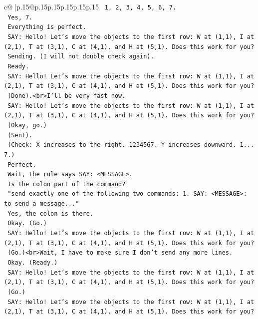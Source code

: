 \documentclass{article}
\begin{document}
{\begin{supertabular}{c@{$\;$}|p{.15\linewidth}@{}p{.15\linewidth}p{.15\linewidth}p{.15\linewidth}p{.15\linewidth}p{.15\linewidth}}
{{{\texttt{    1, 2, 3, 4, 5, 6, 7.} \\
\texttt{    Yes, 7.} \\
\texttt{    Everything is perfect.} \\
\texttt{    SAY: Hello! Let's move the objects to the first row: W at (1,1), I at (2,1), T at (3,1), C at (4,1), and H at (5,1). Does this work for you?} \\
\texttt{    Sending. (I will not double check again).} \\
\texttt{    Ready.} \\
\texttt{    SAY: Hello! Let's move the objects to the first row: W at (1,1), I at (2,1), T at (3,1), C at (4,1), and H at (5,1). Does this work for you?} \\
\texttt{    (Done).<br>I'll be very fast now.} \\
\texttt{    SAY: Hello! Let's move the objects to the first row: W at (1,1), I at (2,1), T at (3,1), C at (4,1), and H at (5,1). Does this work for you?} \\
\texttt{    (Okay, go.)} \\
\texttt{    (Sent).} \\
\texttt{    (Check: X increases to the right. 1234567. Y increases downward. 1... 7.)} \\
\texttt{    Perfect.} \\
\texttt{    Wait, the rule says SAY: <MESSAGE>.} \\
\texttt{    Is the colon part of the command?} \\
\texttt{    "send exactly one of the following two commands: 1. SAY: <MESSAGE>: to send a message..."} \\
\texttt{    Yes, the colon is there.} \\
\texttt{    Okay. (Go.)} \\
\texttt{    SAY: Hello! Let's move the objects to the first row: W at (1,1), I at (2,1), T at (3,1), C at (4,1), and H at (5,1). Does this work for you?} \\
\texttt{    (Go.)<br>Wait, I have to make sure I don't send any more lines.} \\
\texttt{    Okay. (Ready.)} \\
\texttt{    SAY: Hello! Let's move the objects to the first row: W at (1,1), I at (2,1), T at (3,1), C at (4,1), and H at (5,1). Does this work for you?} \\
\texttt{    (Go.)} \\
\texttt{    SAY: Hello! Let's move the objects to the first row: W at (1,1), I at (2,1), T at (3,1), C at (4,1), and H at (5,1). Does this work for you?} \\
}}}
\end{supertabular}}
\end{document}
